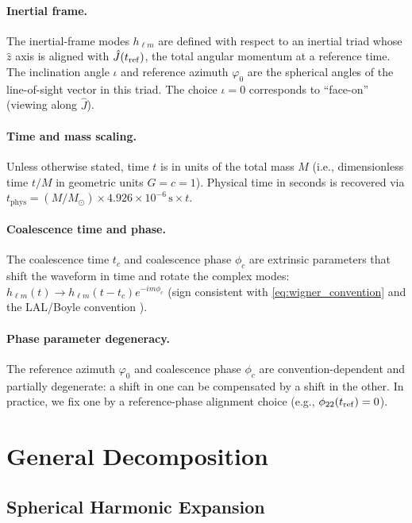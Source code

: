 \documentclass[11pt,a4paper]{article}
\newcommand{\hlm}{h_{\ell m}}
\begin{document}
\paragraph{Inertial frame.} The inertial-frame modes $\hlm$ are defined with respect to an inertial triad whose $\hat{z}$ axis is aligned with $\hat{J}(t_{\rm ref})$, the total angular momentum at a reference time. The inclination angle $\iota$ and reference azimuth $\varphi_0$ are the spherical angles of the line-of-sight vector in this triad. The choice $\iota = 0$ corresponds to ``face-on'' (viewing along $\hat{J}$).

\paragraph{Time and mass scaling.} Unless otherwise stated, time $t$ is in units of the total mass $M$ (i.e., dimensionless time $t/M$ in geometric units $G = c = 1$). Physical time in seconds is recovered via $t_{\text{phys}} = (M/M_\odot) \times 4.926 \times 10^{-6}\,\text{s} \times t$.

\paragraph{Coalescence time and phase.} The coalescence time $t_c$ and coalescence phase $\phi_c$ are extrinsic parameters that shift the waveform in time and rotate the complex modes: $h_{\ell m}(t) \to h_{\ell m}(t - t_c) e^{-i m \phi_c}$ (sign consistent with \eqref{eq:wigner_convention} and the LAL/Boyle convention \cite{boyle2011}).

\paragraph{Phase parameter degeneracy.} The reference azimuth $\varphi_0$ and coalescence phase $\phi_c$ are convention-dependent and partially degenerate: a shift in one can be compensated by a shift in the other. In practice, we fix one by a reference-phase alignment choice (e.g., $\phi_{22}(t_{\rm ref}) = 0$).

\section{General Decomposition}

\subsection{Spherical Harmonic Expansion}
\end{document}

